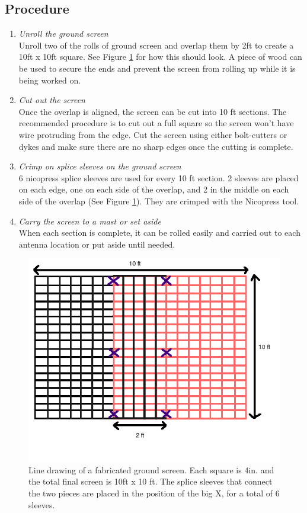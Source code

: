 \documentclass[12pt]{article}
\begin{document}
\begin{enumerate}
	\subsection{Procedure}
		\begin{enumerate}
			\item \emph{Unroll the ground screen} \\ Unroll two of the rolls of ground screen and overlap them by 2ft to create a 10ft x 10ft square. See Figure \ref{Grid} for how this should look. A piece of wood can be used to secure the ends and prevent the screen from rolling up while it is being worked on.
			\item \emph{Cut out the screen} \\ Once the overlap is aligned, the screen can be cut into 10 ft sections. The recommended procedure is to cut out a full square so the screen won't have wire protruding from the edge. Cut the screen using either bolt-cutters or dykes and make sure there are no sharp edges once the cutting is complete.
			\item \emph{Crimp on splice sleeves on the ground screen} \\ 6 nicopress splice sleeves are used for every 10 ft section. 2 sleeves are placed on each edge, one on each side of the overlap, and 2 in the middle on each side of the overlap (See Figure \ref{Grid}). They are crimped with the Nicopress tool.
			\item \emph{Carry the screen to a mast or set aside} \\ When each section is complete, it can be rolled easily and carried out to each antenna location or put aside until needed.
		\end{enumerate}
		
\begin{figure}[!h]
	\center
	\includegraphics[width=\linewidth]{plots/GroundScreenGrid.png}
	\caption{Line drawing of a fabricated ground screen. Each square is 4in. and the total final screen is 10ft x 10 ft. The splice sleeves that connect the two pieces are placed in the position of the big X, for a total of 6 sleeves. \label{Grid}}
\end{figure}



\end{enumerate}
\end{document}
